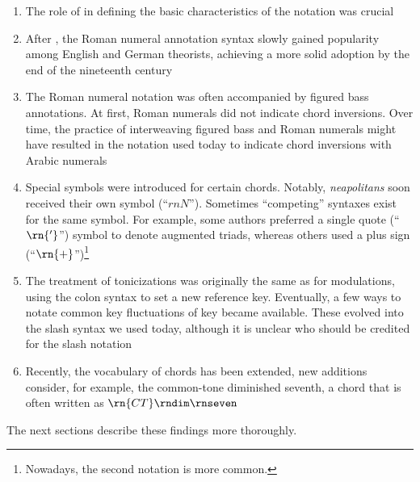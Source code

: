 \begin{enumerate}
    \item The role of \textcite{weber1817versuch} in
    defining the basic characteristics of the notation was
    crucial
    \item After \textcite{weber1817versuch}, the Roman
    numeral annotation syntax slowly gained popularity among
    English and German theorists, achieving a more solid
    adoption by the end of the nineteenth century
    \item The Roman numeral notation was often accompanied
    by figured bass annotations. At first, Roman numerals
    did not indicate chord inversions. Over time, the
    practice of interweaving figured bass and Roman numerals
    might have resulted in the notation used today to
    indicate chord inversions with Arabic numerals
    \item Special symbols were introduced for certain
    chords. Notably, \emph{neapolitans} soon received their
    own symbol (``$rn{N}$''). Sometimes ``competing''
    syntaxes exist for the same symbol. For example, some
    authors preferred a single quote (``$\rn{'}$'') symbol
    to denote augmented triads, whereas others used a plus
    sign (``$\rn{+}$'')\footnote{Nowadays, the second
    notation is more common.}
    \item The treatment of tonicizations was originally the
    same as for modulations, using the colon syntax to set a
    new reference key. Eventually, a few ways to notate
    common key fluctuations of key became available. These
    evolved into the slash syntax we used today, although it
    is unclear who should be credited for the slash notation
    \item Recently, the vocabulary of chords has been
    extended, new additions consider, for example, the
    common-tone diminished seventh, a chord that is often
    written as $\rn{CT}\rndim\rnseven$
\end{enumerate}

The next sections describe these findings more thoroughly.
